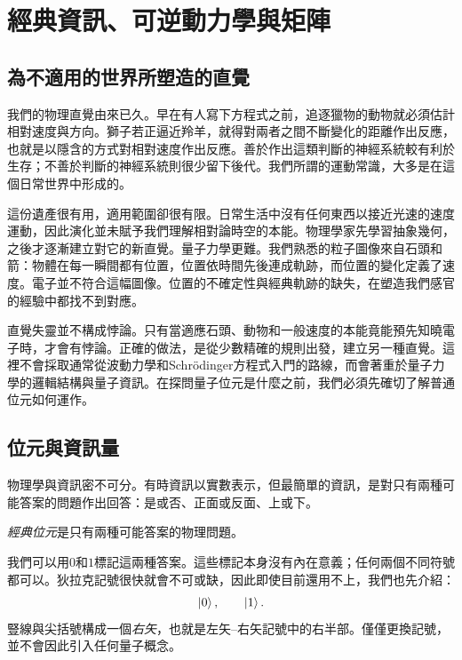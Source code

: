\chapter{經典資訊、可逆動力學與矩陣}


\section{為不適用的世界所塑造的直覺}

我們的物理直覺由來已久。早在有人寫下方程式之前，追逐獵物的動物就必須估計相對速度與方向。獅子若正逼近羚羊，就得對兩者之間不斷變化的距離作出反應，也就是以隱含的方式對相對速度作出反應。善於作出這類判斷的神經系統較有利於生存；不善於判斷的神經系統則很少留下後代。我們所謂的運動常識，大多是在這個日常世界中形成的。

這份遺產很有用，適用範圍卻很有限。日常生活中沒有任何東西以接近光速的速度運動，因此演化並未賦予我們理解相對論時空的本能。物理學家先學習抽象幾何，之後才逐漸建立對它的新直覺。量子力學更難。我們熟悉的粒子圖像來自石頭和箭：物體在每一瞬間都有位置，位置依時間先後連成軌跡，而位置的變化定義了速度。電子並不符合這幅圖像。位置的不確定性與經典軌跡的缺失，在塑造我們感官的經驗中都找不到對應。

直覺失靈並不構成悖論。只有當適應石頭、動物和一般速度的本能竟能預先知曉電子時，才會有悖論。正確的做法，是從少數精確的規則出發，建立另一種直覺。這裡不會採取通常從波動力學和Schr\"odinger方程式入門的路線，而會著重於量子力學的邏輯結構與量子資訊。在探問量子位元是什麼之前，我們必須先確切了解普通位元如何運作。

\section{位元與資訊量}

物理學與資訊密不可分。有時資訊以實數表示，但最簡單的資訊，是對只有兩種可能答案的問題作出回答：是或否、正面或反面、上或下。

\begin{definition}
\emph{經典位元}是只有兩種可能答案的物理問題。
\end{definition}

我們可以用\(0\)和\(1\)標記這兩種答案。這些標記本身沒有內在意義；任何兩個不同符號都可以。狄拉克記號很快就會不可或缺，因此即使目前還用不上，我們也先介紹：
\begin{equation}
  \left\lvert0\right\rangle,
  \qquad
  \left\lvert1\right\rangle.
\end{equation}
豎線與尖括號構成一個\emph{右矢}，也就是左矢--右矢記號中的右半部。僅僅更換記號，並不會因此引入任何量子概念。

